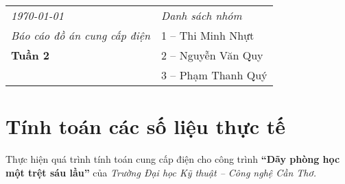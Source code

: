 \documentclass[12pt,a4paper]{article}
\begin{document}
\begin{center}
\begin{tabular}{l|l}
\emph{\large{\today}} & \large{\emph{Danh sách nhóm}} \\
\emph{\Large{Báo cáo đồ án cung cấp điện}}& 1 -- Thi Minh Nhựt \\
\textbf{\large{Tuần 2}}& 2 -- Nguyễn Văn Quy \\
& 3 -- Phạm Thanh Quý\\
\end{tabular}
\end{center}

\section*{{\Huge Tính toán các số liệu thực tế}}
\hspace{.6cm}Thực hiện quá trình tính toán cung cấp điện cho công trình \textbf{``Dãy phòng học một trệt sáu lầu''} của \emph{Trường Đại học Kỹ thuật -- Công nghệ Cần Thơ.}
\end{document}
